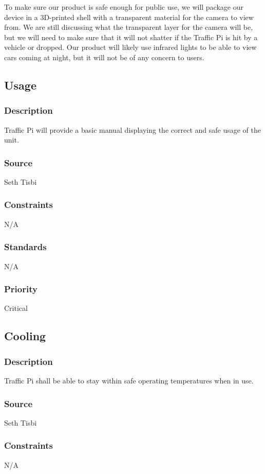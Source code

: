 To make sure our product is safe enough for public use, we will package our device in a 3D-printed shell with a transparent material for the camera to view from. We are still discussing what the transparent layer for the camera will be, but we will need to make sure that it will not shatter if the Traffic Pi is hit by a vehicle or dropped. Our product will likely use infrared lights to be able to view cars coming at night, but it will not be of any concern to users. 

\subsection{Usage}
\subsubsection{Description}
Traffic Pi will provide a basic manual displaying the correct and safe usage of the unit.
\subsubsection{Source}
Seth Tisbi
\subsubsection{Constraints}
N/A
\subsubsection{Standards}
N/A
\subsubsection{Priority}
Critical

\subsection{Cooling}
\subsubsection{Description}
Traffic Pi shall be able to stay within safe operating temperatures when in use.
\subsubsection{Source}
Seth Tisbi
\subsubsection{Constraints}
N/A

